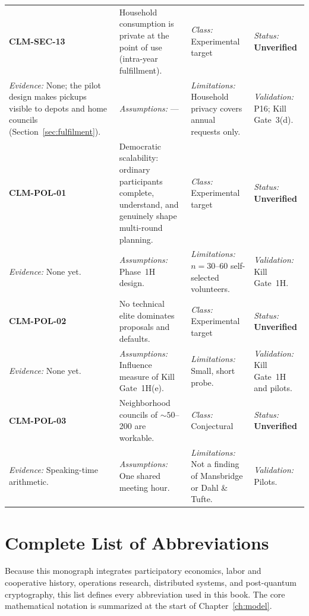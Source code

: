 \documentclass[10pt,twoside,openany]{book}
\theoremstyle{dpepstyle}
\begin{document}
{\begin{longtable}{L{0.92in} L{1.42in} L{1.07in} L{1.12in}}
\addlinespace[1pt]\midrule
\textbf{CLM-SEC-13} & Household consumption is private at the point of use (intra-year fulfillment). & \emph{Class:} Experimental target & \emph{Status:} \textbf{Unverified} \\*
\emph{Evidence:} None; the pilot design makes pickups visible to depots and home councils (Section~\ref{sec:fulfilment}). & \emph{Assumptions:} --- & \emph{Limitations:} Household privacy covers annual requests only. & \emph{Validation:} P16; Kill Gate~3(d). \\
\addlinespace[1pt]\midrule
\textbf{CLM-POL-01} & Democratic scalability: ordinary participants complete, understand, and genuinely shape multi-round planning. & \emph{Class:} Experimental target & \emph{Status:} \textbf{Unverified} \\*
\emph{Evidence:} None yet. & \emph{Assumptions:} Phase~1H design. & \emph{Limitations:} $n=30$--60 self-selected volunteers. & \emph{Validation:} Kill Gate~1H. \\
\addlinespace[1pt]\midrule
\textbf{CLM-POL-02} & No technical elite dominates proposals and defaults. & \emph{Class:} Experimental target & \emph{Status:} \textbf{Unverified} \\*
\emph{Evidence:} None yet. & \emph{Assumptions:} Influence measure of Kill Gate~1H(e). & \emph{Limitations:} Small, short probe. & \emph{Validation:} Kill Gate~1H and pilots. \\
\addlinespace[1pt]\midrule
\textbf{CLM-POL-03} & Neighborhood councils of $\sim 50$--200 are workable. & \emph{Class:} Conjectural & \emph{Status:} \textbf{Unverified} \\*
\emph{Evidence:} Speaking-time arithmetic. & \emph{Assumptions:} One shared meeting hour. & \emph{Limitations:} Not a finding of Mansbridge or Dahl \& Tufte. & \emph{Validation:} Pilots. \\
\end{longtable}}

\chapter{Complete List of Abbreviations}
\label{app:abbreviations}

{\small\color{SlateDark} Because this monograph integrates participatory economics, labor and cooperative history, operations research, distributed systems, and post-quantum cryptography, this list defines every abbreviation used in this book. The core mathematical notation is summarized at the start of Chapter~\ref{ch:model}.}
\end{document}
